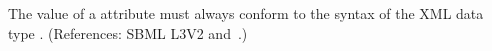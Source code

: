 The value of a  attribute must always conform to the syntax
of the XML data type .  (References: SBML L3V2
 and~.)
